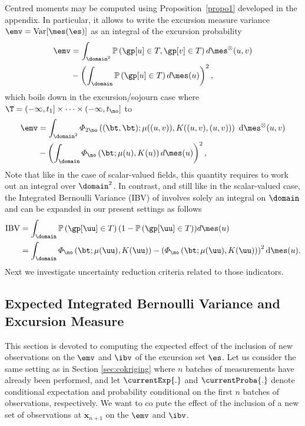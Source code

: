 \medskip

Centred moments may be computed using Proposition~\ref{propo1} developed in the appendix. 
In particular, it allows to write the excursion measure variance $\emv = \operatorname{Var}[\mes(\es)]$ as an integral of the excursion probability
\begin{equation*}
\begin{split}
\emv
&=\int_{\domain^2} \mathbb{P}\left(
\gp[u]\in T, \gp[v]\in T \right)
d\mes^{\otimes}(u, v)\\
&-\left( \int_{\domain} \mathbb{P}\left(\gp[u]\in T\right) d\mes(u) \right)^2,
\end{split}
\end{equation*}
which boils down in the excursion/sojourn case where $\T=(-\infty, t_1] \times
\dots \times (-\infty, t_{\no}]$ to
\begin{equation*}
\begin{split}
\emv
&=\int_{\domain^2}
\varPhi_{2\no}
\left(
(\bt, \bt); \mu((u,v)),
K((u,v),(u,v))
\right)
\
\mathrm{d}\mes^{\otimes} %
(u,v)\\
&-\left( \int_{\domain} \varPhi_{\no}\left(\bt;\mu(u), K(u)\right) d\mes(u) \right)^2,
\end{split}
\end{equation*}
%
Note that like in the case of scalar-valued fields, this quantity requires to work out an integral over $\domain^2$. In 
contrast, and still like in the scalar-valued case, the Integrated Bernoulli Variance (IBV) of \cite{Bect.etal} involves 
solely an integral on $\domain$ and can be expanded in our present settings as follows
\begin{equation*}
\begin{split}
\operatorname{IBV} %
&=\int_{\domain}
\mathbb{P}\left(\gp[\uu]\in T\right)(1-\mathbb{P}\left(\gp[\uu]\in T\right))
d\mes(u) \\
&=\int_{\domain}
\varPhi_{\no}\left(\bt;\mu(\uu), K(\uu)\right)
-\left(\varPhi_{\no}\left(\bt;\mu(\uu), K(\uu)\right) \right)^2
\mathrm{d}\mes(u).
\end{split}
\end{equation*}
%
Next we investigate uncertainty reduction criteria related to those indicators.






\subsection{Expected Integrated Bernoulli Variance and Excursion Measure}
\label{sec:eibv}
This section is devoted to computing the expected effect of the inclusion of new observations on the $\emv$ and $\ibv$ of the excursion set $\es$. Let us consider the same setting as in Section \ref{sec:cokriging} where $n$ batches of measurements have already been performed, and let 
$\currentExp{.}$ and $\currentProba{.}$ denote conditional expectation
and probability conditional on the first $n$ batches of observations, respectively. We want to co pute the effect of the inclusion of a new set of observations at $\bm{x}_{n+1}$ on the $\emv$ and $\ibv$.

